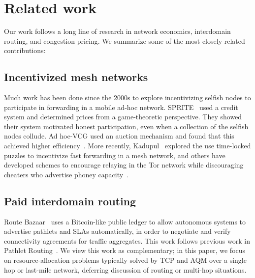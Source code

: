 \section{Related work}
\label{sec:related}

Our work follows a long line of research in network economics,
interdomain routing, and congestion pricing.  We summarize some of the
most closely related contributions:

\subsection{Incentivized mesh networks}
Much work has been done since the 2000s to explore incentivizing selfish nodes to participate in forwarding in a mobile ad-hoc network.
SPRITE~\cite{zhong03} used a credit system and determined prices from a game-theoretic perspective. They showed their system motivated honest participation, even when a collection of the selfish nodes collude. Ad hoc-VCG used an auction mechanism
and found that this achieved higher efficiency~\cite{anderegg03}. More recently, Kadupul~\cite{kadupul15} explored the use time-locked puzzles to incentivize fast forwarding in a mesh network,
and others have developed schemes to encourage relaying in the Tor network while discouraging cheaters who
advertise phoney capacity~\cite{torpath14, onions14}.

\subsection{Paid interdomain routing}

Route Bazaar~\cite{routebazaar15} uses a Bitcoin-like public ledger to
allow autonomous systems to advertise pathlets and SLAs
automatically, in order to negotiate and verify connectivity
agreements for traffic aggregates. This work follows previous work in
Pathlet Routing~\cite{pathlet09}. We view this work as complementary;
in this paper, we focus on resource-allocation problems typically
solved by TCP and AQM over a single hop or last-mile network,
deferring discussion of routing or multi-hop situations.


